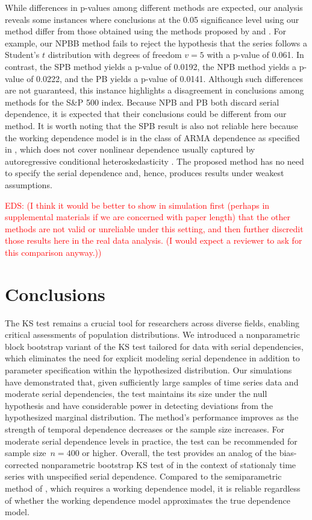 \documentclass[APA,Times1COL]{WileyNJDv5} %
\newcommand{\eds}[1]{\textcolor{red}{EDS: (#1)}}
\begin{document}
While differences in p-values among different methods are expected, our analysis
reveals some instances where conclusions at the 0.05 significance level
using our method differ from those obtained using the methods proposed by
\citet{babu2004goodness} and \citet{zeimbekakis2022misuses}.
For example, our NPBB method fails to reject the
hypothesis that the series follows a Student's $t$ distribution with degrees of
freedom $v = 5$ with a p-value of 0.061. In contrast, 
the SPB method yields a p-value of 0.0192,
the NPB method yields a p-value of 0.0222, and the PB yields a p-value of
0.0141. Although such differences are not guaranteed, this
instance highlights a disagreement in conclusions among methods for the S\&P 500
index. Because NPB and PB both discard serial dependence, it is expected that
their conclusions could be different from our method. It is worth noting that
the SPB result is also not reliable here because the working dependence model is
in the class of ARMA dependence as specified in \citet{zeimbekakis2022misuses},
which does not cover nonlinear dependence usually captured by autoregressive
conditional heteroskedasticity \citep{engle1995arch}. The proposed method has
no need to specify the serial dependence and, hence, produces results under
weakest assumptions.

\eds{I think it would be better to show in simulation first (perhaps 
in supplemental materials if we are concerned with paper length) that the other
methods are not valid or unreliable under this setting, and then 
further discredit those results here in the real data analysis.
(I would expect a reviewer to ask for this comparison anyway.)}

\section{Conclusions}\label{sec:conclusion}

The KS test remains a crucial tool for researchers across diverse fields,
enabling critical assessments of population distributions. We introduced a
nonparametric block bootstrap variant of the KS test tailored for data with
serial dependencies, which eliminates the need for explicit modeling serial
dependence in addition to parameter specification within the hypothesized
distribution. Our simulations have demonstrated that, given
sufficiently large samples of time series data and moderate serial dependencies,
the test maintains its size under the null hypothesis and have considerable
power in detecting deviations from the hypothesized marginal distribution. The
method's performance improves as the strength of temporal dependence decreases
or the sample size increases. For moderate serial dependence levels in practice,
the test can be recommended for sample size~$n = 400$ or higher.
Overall, the test provides an analog of the bias-corrected nonparametric
bootstrap KS test of \citet{babu2004goodness} in the context of stationaly time
series with unspecified serial dependence. Compared to the semiparametric method
of \citet{zeimbekakis2022misuses}, which requires a working dependence model, it
is reliable regardless of whether the working dependence model approximates the
true dependence model.
\end{document}
